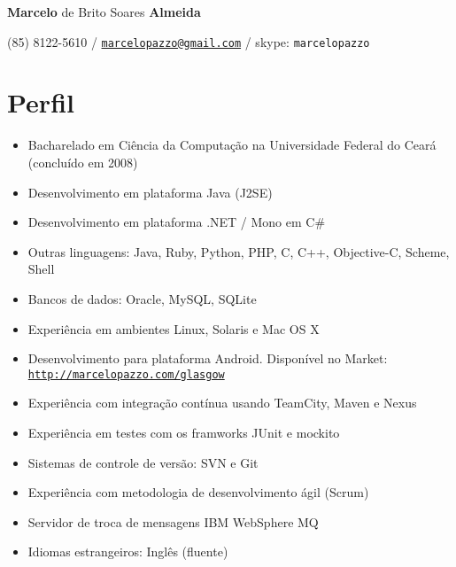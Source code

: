 \documentclass[11pt]{article}
\def\name{\textbf{Marcelo} de Brito Soares \textbf{Almeida}}
\begin{document}
\begin{flushright}

{\huge \name}


\vspace{0.05in}
(85) 8122-5610 / \href{mailto:marcelopazzo@gmail.com}{\tt marcelopazzo@gmail.com} / skype: \tt marcelopazzo

\end{flushright}

\section*{Perfil}
\begin{itemize}
  \item Bacharelado em Ciência da Computação na Universidade Federal do Ceará (concluído em 2008)
  \item Desenvolvimento em plataforma Java (J2SE)
  \item Desenvolvimento em plataforma .NET / Mono em C\#
  \item Outras linguagens: Java, Ruby, Python, PHP, C, C++, Objective-C, Scheme, Shell
  \item Bancos de dados: Oracle, MySQL, SQLite
  \item Experiência em ambientes Linux, Solaris e Mac OS X
  \item Desenvolvimento para plataforma Android. Disponível no Market:
            \href{http://marcelopazzo.com/glasgow}{\tt http://marcelopazzo.com/glasgow}
  \item Experiência com integração contínua usando TeamCity, Maven e Nexus
  \item Experiência em testes com os framworks JUnit e mockito
  \item Sistemas de controle de versão: SVN e Git
  \item Experiência com metodologia de desenvolvimento ágil (Scrum)
  \item Servidor de troca de mensagens IBM WebSphere MQ
  \item Idiomas estrangeiros: Inglês (fluente)
\end{itemize}
\end{document}
